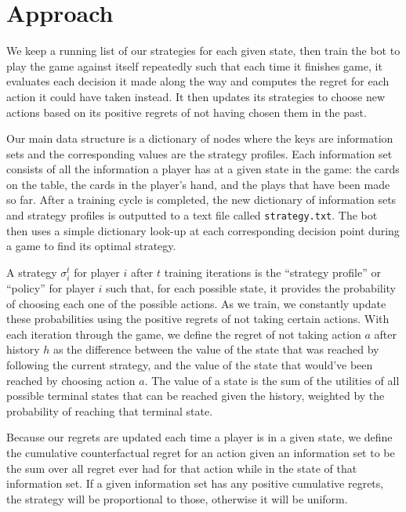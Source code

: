 \documentclass[11pt]{article}
\begin{document}
\section{Approach}

We keep a running list of our strategies for each given state, then train the bot to play the game against itself repeatedly such that each time it finishes game, it evaluates each decision it made along the way and computes the regret for each action it could have taken instead. It then updates its strategies to choose new actions based on its positive regrets of not having chosen them in the past. 

Our main data structure is a dictionary of nodes where the keys are information sets and the corresponding values are the strategy profiles. Each information set consists of all the information a player has at a given state in the game: the cards on the table, the cards in the player’s hand, and the plays that have been made so far. After a training cycle is completed, the new dictionary of information sets and strategy profiles is outputted to a text file called \texttt{strategy.txt}. The bot then uses a simple dictionary look-up at each corresponding decision point during a game to find its optimal strategy.

A strategy $\sigma_i^t$ for player $i$ after $t$ training iterations is the ``strategy profile'' or ``policy'' for player $i$ such that, for each possible state, it provides the probability of choosing each one of the possible actions. As we train, we constantly update these probabilities using the positive regrets of not taking certain actions. With each iteration through the game, we define the regret of not taking action $a$ after history $h$ as the difference between the value of the state that was reached by following the current strategy, and the value of the state that would’ve been reached by choosing action $a$. The value of a state is the sum of the utilities of all possible terminal states that can be reached given the history, weighted by the probability of reaching that terminal state.

Because our regrets are updated each time a player is in a given state, we define the cumulative counterfactual regret for an action given an information set to be the sum over all regret ever had for that action while in the state of that information set. If a given information set has any positive cumulative regrets, the strategy will be proportional to those, otherwise it will be uniform.
\end{document}
